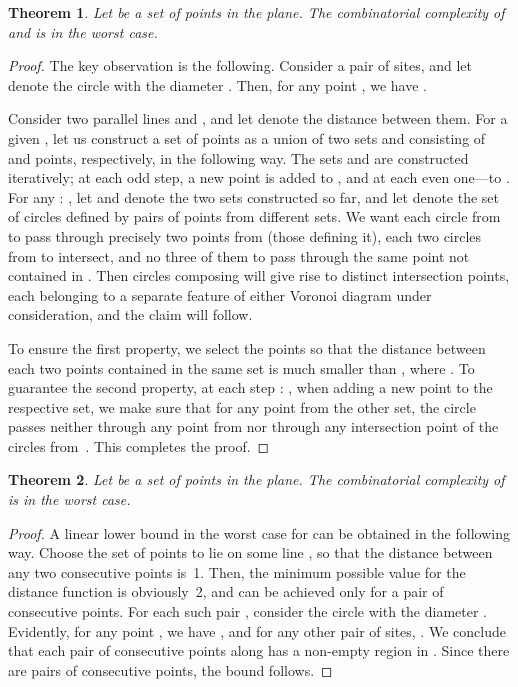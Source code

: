 \documentclass[10pt, conference, compsocconf]{IEEEtran}
\newtheorem{theorem}{Theorem}
\begin{document}
\begin{theorem}
   Let  be a set of  points in the plane.
   The combinatorial complexity of  and 
   is  in the worst case.
\end{theorem}

\begin{proof}
   The key observation is the following.  Consider a pair  of sites,
   and let  denote the circle with the diameter .  Then, for
   any point , we have
   .

   Consider two parallel lines  and , and let  denote the
   distance between them.  For a given , let us construct a set 
   of  points as a union of two sets  and 
   consisting of  and  points,
   respectively, in the following way.  The sets  and  are
   constructed iteratively; at each odd step, a new point is added to ,
   and at each even one---to .  For any : , let 
   and  denote the two sets constructed so far, and let
    denote the set of circles
   defined by pairs of points from different sets.
   We want each circle from  to pass through precisely two points from  (those defining it), each two circles from  to intersect, and no three of them to
   pass through the same point not contained in . Then  circles composing 
   will give rise to  distinct intersection points, each
   belonging to a separate feature of either Voronoi diagram under
   consideration, and the claim will follow.

   To ensure the first property, we select the points so that the distance
   between each two points contained in the same set  is much smaller
   than , where . To guarantee the second property, at each step
   : , when adding a new point  to the respective set,
   we make sure that for any point  from the other set, the circle
    passes neither through any point from  nor through any intersection point of the
   circles from~.
   This completes the proof.
\end{proof}

\begin{theorem}
   Let  be a set of  points in the plane.
   The combinatorial complexity of  is  in the
   worst case.
\end{theorem}

\begin{proof}
   A linear lower bound in the worst case for  can be
   obtained in the following way.  Choose the set  of points to lie on
   some line , so that the distance between any two consecutive
   points is~1. Then, the minimum possible value for the distance function
    is obviously~2, and can be achieved only for a pair  of
   consecutive points.  For each such pair , consider the circle
    with the diameter .  Evidently,
   for any point , we have
   , and for any other pair  of sites,
   .  We conclude that each pair of consecutive points
   along  has a non-empty region in .  Since there
   are  pairs of consecutive points, the bound follows.
\end{proof}
\end{document}
